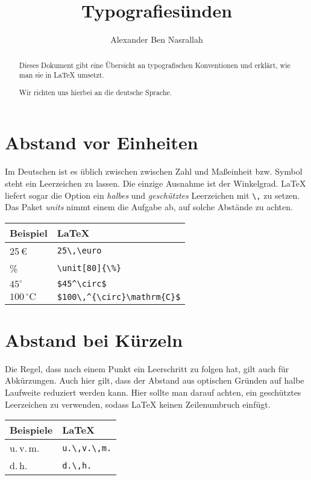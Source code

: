 \documentclass[a4paper]{article}
\title{Typografies\"unden}
\author{Alexander Ben Nasrallah}
\begin{document}
\maketitle
\begin{abstract}
	Dieses Dokument gibt eine \"Ubersicht an typografischen Konventionen und
	erkl\"art, wie man sie in \LaTeX{} umsetzt.

	Wir richten uns hierbei an die deutsche Sprache.
\end{abstract}

\tableofcontents

\section{Abstand vor Einheiten}
Im Deutschen ist es \"ublich zwischen zwischen
Zahl und Ma\ss{}einheit bzw. Symbol steht ein Leerzeichen zu lassen. Die
einzige Ausnahme ist der Winkelgrad. \LaTeX{} liefert sogar die Option
ein \emph{halbes} und \emph{gesch\"utztes} Leerzeichen mit \verb+\,+ zu
setzen. Das Paket \emph{units} nimmt einem die Aufgabe ab, auf solche
Abst\"ande zu achten.

\begin{tabular}[c]{|ll|}
	\hline
	\bf{Beispiel}             & \bf{\LaTeX}                       \\
	\hline
	25\,\euro                 & \verb+25\,\euro+                  \\
	\unit[80]{\%}             & \verb+\unit[80]{\%}+              \\
	$45^\circ$                & \verb+$45^\circ$+                 \\
	$100\,^{\circ}\mathrm{C}$ & \verb+$100\,^{\circ}\mathrm{C}$+ \\
	\hline
\end{tabular}

\section{Abstand bei K\"urzeln}
Die Regel, dass nach einem Punkt ein
Leerschritt zu folgen hat, gilt auch für Abkürzungen. Auch hier gilt,
dass der Abstand aus optischen Gründen auf halbe Laufweite reduziert
werden kann. Hier sollte man darauf achten, ein gesch\"utztes
Leerzeichen zu verwenden, sodass \LaTeX{} keinen Zeilenumbruch
einf\"ugt.

\begin{tabular}[c]{|ll|}
	\hline
	\bf{Beispiele} & \bf{\LaTeX}       \\
	\hline
	u.\,v.\,m.     & \verb+u.\,v.\,m.+ \\
	d.\,h.         & \verb+d.\,h.+     \\
	\hline
\end{tabular}
\end{document}
